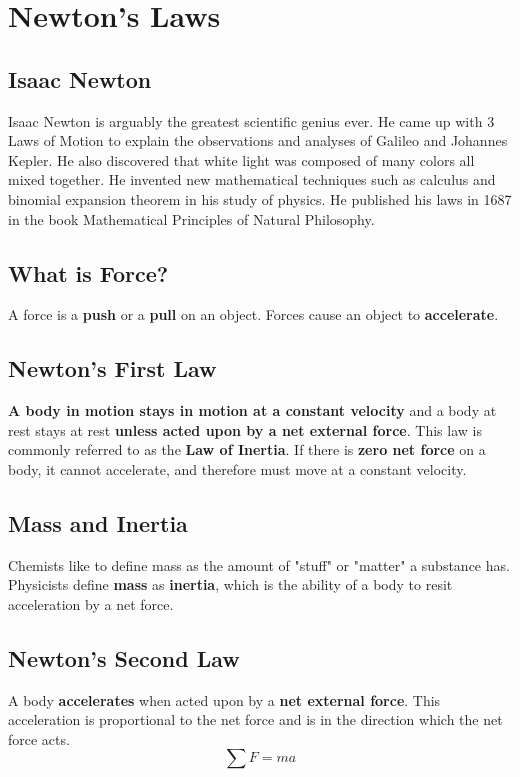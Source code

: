\section{Newton's Laws}
	
\subsection{Isaac Newton}
Isaac Newton is arguably the greatest scientific genius ever. He came up with 3 Laws of Motion to explain the observations and analyses of Galileo and Johannes Kepler. He also discovered that white light was composed of many colors all mixed together. He invented new mathematical techniques such as calculus and binomial expansion theorem in his study of physics. He published his laws in 1687 in the book Mathematical Principles of Natural Philosophy.
	
\subsection{What is Force?}
A force is a \textbf{push} or a \textbf{pull} on an object. Forces cause an object to \textbf{accelerate}.
	
\subsection{Newton's First Law}
\textbf{A body in motion stays in motion at a constant velocity} and a body at rest stays at rest \textbf{unless acted upon by a net external force}. This law is commonly referred to as the \textbf{Law of Inertia}. If there is \textbf{zero net force} on a body, it cannot accelerate, and therefore must move at a constant velocity. 
	
\subsection{Mass and Inertia}
Chemists like to define mass as the amount of "stuff" or "matter" a substance has. Physicists define \textbf{mass} as \textbf{inertia}, which is the ability of a body to resit acceleration by a net force.
	
\subsection{Newton's Second Law}
A body \textbf{accelerates} when acted upon by a \textbf{net external force}. This acceleration is proportional to the net force and is in the direction which the net force acts. \[\sum F=ma\]

